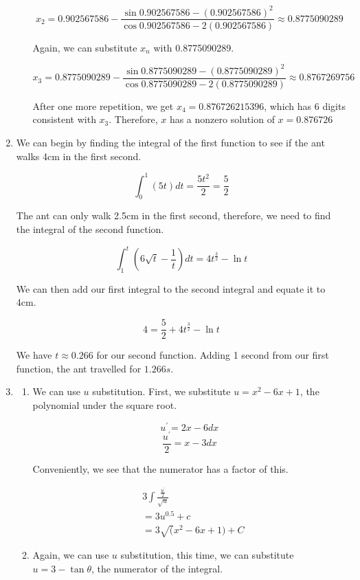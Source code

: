 \documentclass[11pt, letterpaper, twoside]{article}
\begin{document}
\begin{enumerate}
\begin{enumerate}[label=\alph*)]
\[x_2=0.902567586-\frac{\sin0.902567586-\left(0.902567586\right)^2}{\cos0.902567586-2\left(0.902567586\right)}\approx0.8775090289\]

Again, we can substitute \(x_n\) with 0.8775090289.

\[x_3=0.8775090289-\frac{\sin0.8775090289-\left(0.8775090289\right)^2}{\cos0.8775090289-2\left(0.8775090289\right)}\approx0.8767269756\]

After one more repetition, we get \(x_4=0.876726215396\), which has 6 digits consistent with \(x_3\).
Therefore, \(x\) has a nonzero solution of \(\boxed{x=0.876726}\)

\end{enumerate}

\item %
We can begin by finding the integral of the first function to see if the ant walks 4cm in the first second.

\[\int_0^1(5t)dt=\frac{5t^2}{2}=\frac{5}{2}\]

The ant can only walk 2.5cm in the first second, therefore, we need to find the integral of the second function.

\[\int_1^t(6\sqrt t-\frac{1}{t})dt=4t^{\frac{3}{2}}-\ln t\]

We can then add our first integral to the second integral and equate it to 4cm.

\[4=\frac{5}{2}+4t^{\frac{3}{2}}-\ln t \]

We have \(t\approx0.266\) for our second function. 
Adding 1 second from our first function, the ant travelled for \(\boxed{1.266s}\).

\item %
\begin{enumerate}[label=\alph*)]
\item We can use \(u\) substitution. 
First, we substitute \(u=x^2-6x+1\), the polynomial under the square root.

\[u^\prime=2x-6 dx\]
\[\frac{u^\prime}{2}=x-3dx\]

Conveniently, we see that the numerator has a factor of this.

\begin{align*}
&3\int \frac{\frac{u^\prime}{2}}{\sqrt{u}}\\
&= 3u^{0.5}+c\\
&= \boxed{3\sqrt(x^2-6x+1)+C}
\end{align*}
\item Again, we can use \(u\) substitution, this time, 
we can substitute \(u=3-\tan\theta\), the numerator of the integral.


\end{enumerate}
\end{enumerate}
\end{document}
